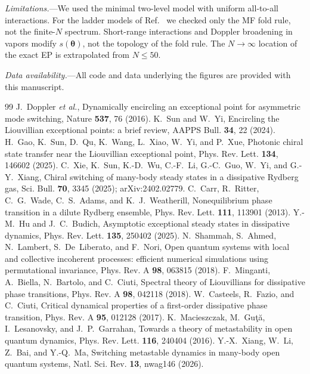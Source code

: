 \documentclass[aps,prl,twocolumn,superscriptaddress,amsmath,amssymb,reprint]{revtex4-2}
\begin{document}
\emph{Limitations.}---We used the minimal two-level model with uniform all-to-all interactions. For the ladder models of Ref.~\cite{Xie2025} we checked only the MF fold rule, not the finite-$N$ spectrum. Short-range interactions and Doppler broadening in vapors modify $s(\bm\theta)$, not the topology of the fold rule. The $N\to\infty$ location of the exact EP is extrapolated from $N\leq50$.

\emph{Data availability.}---All code and data underlying the figures are provided with this manuscript.

\begin{thebibliography}{99}
 J.~Doppler \textit{et al.}, Dynamically encircling an exceptional point for asymmetric mode switching, Nature \textbf{537}, 76 (2016).
 K.~Sun and W.~Yi, Encircling the Liouvillian exceptional points: a brief review, AAPPS Bull. \textbf{34}, 22 (2024).
 H.~Gao, K.~Sun, D.~Qu, K.~Wang, L.~Xiao, W.~Yi, and P.~Xue, Photonic chiral state transfer near the Liouvillian exceptional point, Phys. Rev. Lett. \textbf{134}, 146602 (2025).
 C.~Xie, K.~Sun, K.-D.~Wu, C.-F.~Li, G.-C.~Guo, W.~Yi, and G.-Y.~Xiang, Chiral switching of many-body steady states in a dissipative Rydberg gas, Sci. Bull. \textbf{70}, 3345 (2025); arXiv:2402.02779.
 C.~Carr, R.~Ritter, C.~G.~Wade, C.~S.~Adams, and K.~J.~Weatherill, Nonequilibrium phase transition in a dilute Rydberg ensemble, Phys. Rev. Lett. \textbf{111}, 113901 (2013).
 Y.-M.~Hu and J.~C.~Budich, Asymptotic exceptional steady states in dissipative dynamics, Phys. Rev. Lett. \textbf{135}, 250402 (2025).
 N.~Shammah, S.~Ahmed, N.~Lambert, S.~De~Liberato, and F.~Nori, Open quantum systems with local and collective incoherent processes: efficient numerical simulations using permutational invariance, Phys. Rev. A \textbf{98}, 063815 (2018).
 F.~Minganti, A.~Biella, N.~Bartolo, and C.~Ciuti, Spectral theory of Liouvillians for dissipative phase transitions, Phys. Rev. A \textbf{98}, 042118 (2018).
 W.~Casteels, R.~Fazio, and C.~Ciuti, Critical dynamical properties of a first-order dissipative phase transition, Phys. Rev. A \textbf{95}, 012128 (2017).
 K.~Macieszczak, M.~Gu\c{t}\u{a}, I.~Lesanovsky, and J.~P.~Garrahan, Towards a theory of metastability in open quantum dynamics, Phys. Rev. Lett. \textbf{116}, 240404 (2016).
 Y.-X.~Xiang, W.~Li, Z.~Bai, and Y.-Q.~Ma, Switching metastable dynamics in many-body open quantum systems, Natl. Sci. Rev. \textbf{13}, nwag146 (2026).
\end{thebibliography}
\end{document}
